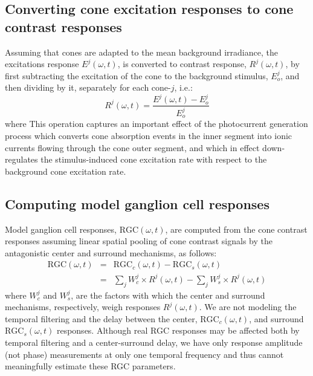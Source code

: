 \documentclass[11pt, oneside]{article}   	%
\begin{document}
\subsection{Converting cone excitation responses to cone contrast responses}
Assuming that cones are adapted to the mean background irradiance, the excitations response $E^j(\omega,t)$, is converted to contrast response, $R^j(\omega, t)$, by first subtracting the excitation of the cone to the background stimulus, $E^j_o$, and then dividing by it, separately for each cone-$j$, i.e.:
\begin{equation}
R^j(\omega, t) = \frac{E^j(\omega,t) - E^j_o}{E^j_o}
\end{equation}
\noindent where
This operation captures an important effect of the photocurrent generation process which converts cone absorption events in the inner segment into ionic currents flowing through the cone outer segment, and which in effect down-regulates the stimulus-induced cone excitation rate with respect to the background cone excitation rate.



\subsection{Computing model ganglion cell responses}
Model ganglion cell responses, $\mbox{RGC}(\omega,t)$, are computed from the cone contrast responses assuming linear spatial pooling of cone contrast signals by the antagonistic center and surround mechanisms, as follows:
\begin{eqnarray}
\mbox{RGC}(\omega,t) & = & \mbox{RGC}_c(\omega,t) - \mbox{RGC}_s(\omega,t) \\
& = & \sum_{j} W_{c}^j  \times R^j(\omega, t) -  \sum_{j} W_{s}^j  \times R^j(\omega, t)
\end{eqnarray}
%
\noindent where $W_{c}^j$ and $W_{s}^j$, are the factors with which the center and surround mechanisms, respectively, weigh responses $R^j(\omega, t)$. We are not modeling the temporal filtering and the delay between the center, $\mbox{RGC}_c(\omega,t)$, and surround $\mbox{RGC}_s(\omega,t)$ responses. Although real RGC responses may be affected both by temporal filtering and a center-surround delay, we have only response amplitude (not phase) measurements at only one temporal frequency and thus cannot meaningfully estimate these RGC parameters.
\end{document}
